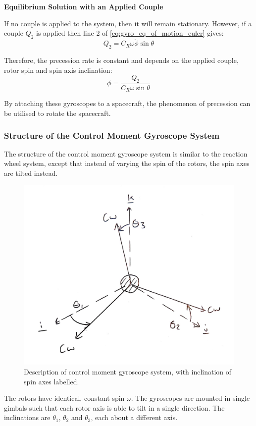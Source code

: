 \documentclass[12]{article}
\begin{document}
\begin{multicols*}{2}
\textbf{Equilibrium Solution with an Applied Couple}

If no couple is applied to the system, then it will remain stationary. However, if a couple $Q_2$ is applied then line 2 of \cref{eq:gyro_eq_of_motion_euler} gives:
\begin{equation}
Q_2 = C_R\omega\dot{\phi}\sin\theta
\end{equation}

Therefore, the precession rate is constant and depends on the applied couple, rotor spin and spin axis inclination:
\begin{equation} \label{eq:gyro_precession_rate}
\dot{\phi} = \frac{Q_2}{C_R\omega\sin\theta}
\end{equation}

By attaching these gyroscopes to a spacecraft, the phenomenon of precession can be utilised to rotate the spacecraft.

\subsubsection{Structure of the Control Moment Gyroscope System}

The structure of the control moment gyroscope system is similar to the reaction wheel system, except that instead of varying the spin of the rotors, the spin axes are tilted instead.

\begin{figure}[H]
\centering
\includegraphics[width=0.6\linewidth]{fig/cmg_diagram.jpg}
\vspace{-0.3cm}
\caption{\label{fig:cmg_diagram}Description of control moment gyroscope system, with inclination of spin axes labelled.}
\end{figure}

The rotors have identical, constant spin $\omega$. The gyroscopes are mounted in single-gimbals such that each rotor axis is able to tilt in a single direction. The inclinations are $\theta_1$, $\theta_2$ and $\theta_3$, each about a different axis.


\end{multicols*}
\end{document}
